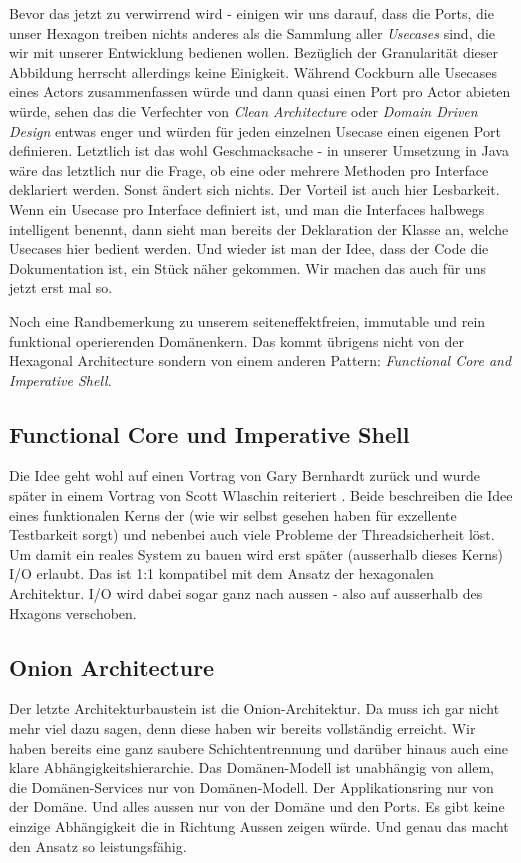 Bevor das jetzt zu verwirrend wird - einigen wir uns darauf, dass die Ports,
die unser Hexagon treiben nichts anderes als die Sammlung aller 
\textit{Usecases} sind, die wir mit unserer Entwicklung bedienen wollen. Bezüglich
der Granularität dieser Abbildung herrscht allerdings keine Einigkeit. Während 
Cockburn alle Usecases eines Actors zusammenfassen würde und dann quasi
einen Port pro Actor abieten würde, sehen das die Verfechter von
\textit{Clean Architecture} oder \textit{Domain Driven Design} entwas enger
und würden für jeden einzelnen Usecase einen eigenen Port definieren.
Letztlich ist das wohl Geschmacksache - in unserer Umsetzung in Java wäre
das letztlich nur die Frage, ob eine oder mehrere Methoden pro Interface
deklariert werden. Sonst ändert sich nichts. Der Vorteil ist auch hier
Lesbarkeit. Wenn ein Usecase pro Interface definiert ist, und man die
Interfaces halbwegs intelligent benennt, dann sieht man bereits der 
Deklaration der Klasse an, welche Usecases hier bedient werden. Und wieder
ist man der Idee, dass der Code die Dokumentation ist, ein Stück näher gekommen.
Wir machen das auch für uns jetzt erst mal so.

Noch eine Randbemerkung zu unserem seiteneffektfreien, immutable und rein 
funktional operierenden Domänenkern. Das kommt übrigens nicht von der
Hexagonal Architecture sondern von einem anderen Pattern: \textit{Functional
Core and Imperative Shell}.

\subsection{Functional Core und Imperative Shell}
Die Idee geht wohl auf einen Vortrag von Gary Bernhardt \cite{bernhardt_2012}
zurück und wurde später in einem Vortrag von Scott Wlaschin reiteriert
\cite{wlaschin_2024}. Beide beschreiben die Idee eines funktionalen Kerns
der (wie wir selbst gesehen haben für exzellente Testbarkeit sorgt) und
nebenbei auch viele Probleme der Threadsicherheit löst. Um damit ein reales
System zu bauen wird erst später (ausserhalb dieses Kerns) I/O erlaubt.
Das ist 1:1 kompatibel mit dem Ansatz der hexagonalen Architektur. I/O
wird dabei sogar ganz nach aussen - also auf ausserhalb des Hxagons verschoben. 

\subsection{Onion Architecture}
Der letzte Architekturbaustein ist die Onion-Architektur. Da muss ich gar
nicht mehr viel dazu sagen, denn diese haben wir bereits vollständig erreicht.
Wir haben bereits eine ganz saubere Schichtentrennung und darüber hinaus
auch eine klare Abhängigkeitshierarchie. Das Domänen-Modell ist unabhängig 
von allem, die Domänen-Services nur von Domänen-Modell. Der Applikationsring
nur von der Domäne. Und alles aussen nur von der Domäne und den Ports.
Es gibt keine einzige Abhängigkeit die in Richtung Aussen zeigen würde.
Und genau das macht den Ansatz so leistungsfähig.


